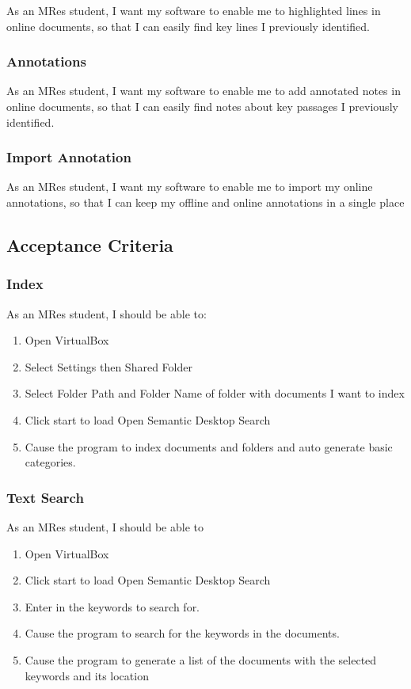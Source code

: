 \documentclass{article}
\begin{document}
As an MRes student, I want my software to enable me to highlighted lines in online documents, so that I can easily find key lines I previously identified.

\subsubsection*{Annotations}

As an MRes student, I want my software to enable me to add annotated notes in online documents, so that I can easily find notes about key passages I previously identified.

\subsubsection*{Import Annotation}
As an MRes student, I want my software to enable me to import my online annotations, so that I can keep my offline and online annotations in a single place

\subsection*{Acceptance Criteria}

\subsubsection*{Index}

As an MRes student, I should be able to:
\begin{enumerate}
\item Open VirtualBox
\item Select Settings then Shared Folder
\item Select Folder Path and Folder Name of folder with documents I want to index
\item Click start to load Open Semantic Desktop Search
\item Cause the program to index documents and folders and auto generate basic categories.
\end{enumerate}

\subsubsection*{Text Search}

As an MRes student, I should be able to
\begin{enumerate}
\item Open VirtualBox
\item Click start to load Open Semantic Desktop Search
\item Enter in the keywords to search for.
\item Cause the program to search for the keywords in the documents.
\item Cause the program to generate a list of the documents with the selected keywords and its location
\end{enumerate}
\end{document}
